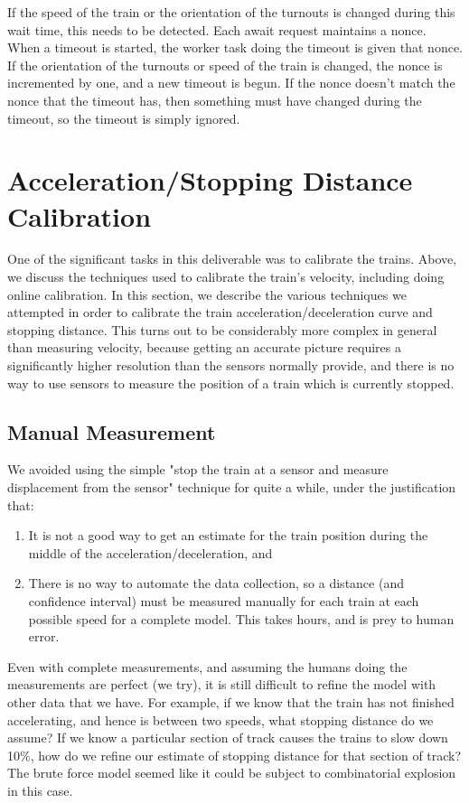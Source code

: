 \documentclass[titlepage]{article}
\begin{document}
If the speed of the train or the orientation of the turnouts is changed
during this wait time, this needs to be detected.
Each await request maintains a nonce.
When a timeout is started, the worker task doing the timeout is given
that nonce.
If the orientation of the turnouts or speed of the train is changed,
the nonce is incremented by one, and a new timeout is begun.
If the nonce doesn't match the nonce that the timeout has, then something
must have changed during the timeout, so the timeout is simply ignored.



\section{Acceleration/Stopping Distance Calibration}
One of the significant tasks in this deliverable was to calibrate the trains.
Above, we discuss the techniques used to calibrate the train's velocity,
including doing online calibration. In this section, we describe the various
techniques we attempted in order to calibrate the train
acceleration/deceleration curve and stopping distance. This turns out to be
considerably more complex in general than measuring velocity, because getting
an accurate picture requires a significantly higher resolution than the sensors
normally provide, and there is no way to use sensors to measure the position of
a train which is currently stopped.

\subsection{Manual Measurement}
We avoided using the simple "stop the train
at a sensor and measure displacement from the sensor" technique for quite a
while, under the justification that:
\begin{enumerate}
\item It is not a good way to get an estimate for the train position during
	the middle of the acceleration/deceleration, and
\item There is no way to automate the data collection, so a distance (and
confidence interval) must be measured manually for each train at each possible
speed for a complete model. This takes hours, and is prey to human error.
\end{enumerate}
Even with complete measurements, and assuming the humans doing the measurements
are perfect (we try), it is still difficult to refine the model with other
data that we have. For example, if we know that the train has not finished
accelerating, and hence is between two speeds, what stopping distance do we
assume? If we know a particular section of track causes the trains to slow
down 10\%, how do we refine our estimate of stopping distance for that section
of track? The brute force model seemed like it could be subject to
combinatorial explosion in this case.
\end{document}
